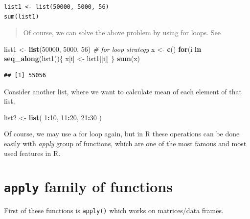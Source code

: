 \documentclass[
]{book}
\newenvironment{Shaded}{\begin{snugshade}}{\end{snugshade}}
\newcommand{\CommentTok}[1]{\textcolor[rgb]{0.56,0.35,0.01}{\textit{#1}}}
\newcommand{\ControlFlowTok}[1]{\textcolor[rgb]{0.13,0.29,0.53}{\textbf{#1}}}
\newcommand{\DecValTok}[1]{\textcolor[rgb]{0.00,0.00,0.81}{#1}}
\newcommand{\FunctionTok}[1]{\textcolor[rgb]{0.13,0.29,0.53}{\textbf{#1}}}
\newcommand{\NormalTok}[1]{#1}
\newcommand{\OtherTok}[1]{\textcolor[rgb]{0.56,0.35,0.01}{#1}}
\newcommand{\SpecialCharTok}[1]{\textcolor[rgb]{0.81,0.36,0.00}{\textbf{#1}}}
\begin{document}
\begin{verbatim}
list1 <- list(50000, 5000, 56)
sum(list1)
\end{verbatim}

\begin{quote}
Of course, we can solve the above problem by using for loops. See
\end{quote}

\begin{Shaded}
\begin{Highlighting}[]
\NormalTok{list1 }\OtherTok{\textless{}{-}} \FunctionTok{list}\NormalTok{(}\DecValTok{50000}\NormalTok{, }\DecValTok{5000}\NormalTok{, }\DecValTok{56}\NormalTok{)}
\CommentTok{\# for loop strategy}
\NormalTok{x }\OtherTok{\textless{}{-}} \FunctionTok{c}\NormalTok{()}
\ControlFlowTok{for}\NormalTok{(i }\ControlFlowTok{in} \FunctionTok{seq\_along}\NormalTok{(list1))\{}
\NormalTok{  x[i] }\OtherTok{\textless{}{-}}\NormalTok{ list1[[i]]}
\NormalTok{\}}
\FunctionTok{sum}\NormalTok{(x)}
\end{Highlighting}
\end{Shaded}

\begin{verbatim}
## [1] 55056
\end{verbatim}

Consider another list, where we want to calculate mean of each element of that list.

\begin{Shaded}
\begin{Highlighting}[]
\NormalTok{list2 }\OtherTok{\textless{}{-}} \FunctionTok{list}\NormalTok{(}
  \DecValTok{1}\SpecialCharTok{:}\DecValTok{10}\NormalTok{,}
  \DecValTok{11}\SpecialCharTok{:}\DecValTok{20}\NormalTok{,}
  \DecValTok{21}\SpecialCharTok{:}\DecValTok{30}
\NormalTok{)}
\end{Highlighting}
\end{Shaded}

Of course, we may use a for loop again, but in R these operations can be done easily with \emph{apply} group of functions, which are one of the most famous and most used features in R.

\hypertarget{apply-family-of-functions}{%
\section{\texorpdfstring{\texttt{apply} family of functions}{apply family of functions}}\label{apply-family-of-functions}}

First of these functions is \texttt{apply()} which works on matrices/data frames.
\end{document}
